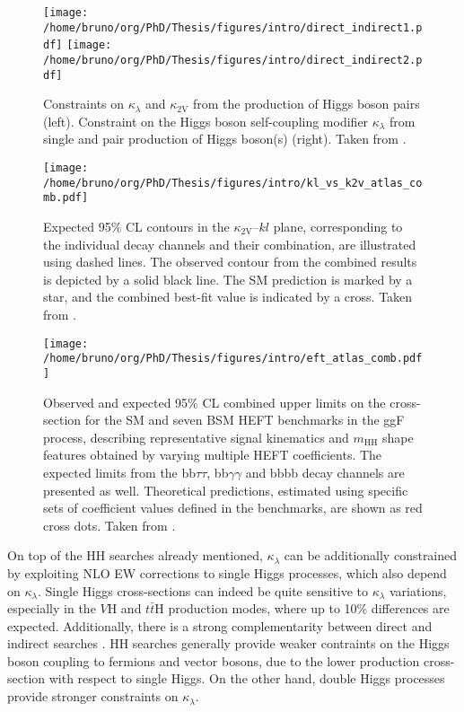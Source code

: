 \documentclass[11pt]{article}
\newcommand{\kl}{\kappa_{\lambda}}
\newcommand{\kvv}{\kappa_{\text{2V}}}
\newcommand{\mhh}{m_{\text{HH}}}
\newcommand{\bbbb}{bbbb}
\newcommand{\bbgg}{bb$\gamma\gamma$}
\newcommand{\bbtt}{bb$\tau\tau$}
\newcommand{\tth}{$t\bar{t}\text{H}$}
\newcommand{\vh}{$V\text{H}$}
\begin{document}
\begin{figure}
\texttt{[image: /home/bruno/org/PhD/Thesis/figures/intro/direct\_indirect1.pdf]}
\texttt{[image: /home/bruno/org/PhD/Thesis/figures/intro/direct\_indirect2.pdf]}
\caption{\label{fig:direct_vs_indirect_cms}Constraints on \(\kl\) and \(\kvv\) from the production of Higgs boson pairs (left). Constraint on the Higgs boson self-coupling modifier \(\kl\) from single and pair production of Higgs boson(s) (right). Taken from \cite{higgs_10_years}.}
\end{figure}

\begin{figure}
\texttt{[image: /home/bruno/org/PhD/Thesis/figures/intro/kl\_vs\_k2v\_atlas\_comb.pdf]}
\caption{\label{fig:kl_vs_k2v_atlas}Expected 95\% CL contours in the \(\kvv{}–kl{}\) plane, corresponding to the individual decay channels and their combination, are illustrated using dashed lines. The observed contour from the combined results is depicted by a solid black line. The \ac{SM} prediction is marked by a star, and the combined best-fit value is indicated by a cross. Taken from \cite{atlas_hh_comb}.}
\end{figure}

\begin{figure}
\texttt{[image: /home/bruno/org/PhD/Thesis/figures/intro/eft\_atlas\_comb.pdf]}
\caption{\label{fig:kl_vs_k2v_atlas}Observed and expected 95\% CL combined upper limits on the cross-section for the \ac{SM} and seven \ac{BSM} HEFT benchmarks in the ggF process, describing representative signal kinematics and \(\mhh\) shape features obtained by varying multiple \ac{HEFT} coefficients. The expected limits from the \bbtt{}, \bbgg{} and \bbbb{} decay channels are presented as well. Theoretical predictions, estimated using specific sets of coefficient values defined in the benchmarks, are shown as red cross dots. Taken from \cite{atlas_hh_comb}.}
\end{figure}



On top of the HH searches already mentioned, \(\kl\) can be additionally constrained by exploiting \ac{NLO} \ac{EW} corrections to single Higgs processes, which also depend on \(\kl\).
Single Higgs cross-sections can indeed be quite sensitive to \(\kl\) variations, especially in the \vh{} and \tth{} production modes, where up to 10\% differences are expected.
Additionally, there is a strong complementarity between direct and indirect searches \cite{indirect_searches2}.
HH searches generally provide weaker contraints on the Higgs boson coupling to fermions and vector bosons, due to the lower production cross-section with respect to single Higgs.
On the other hand, double Higgs processes provide stronger constraints on \(\kl\).
\end{document}
